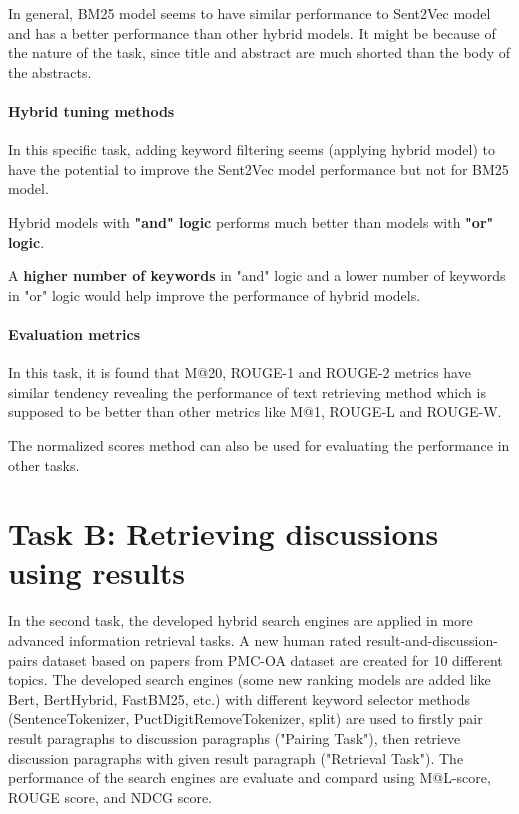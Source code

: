 \documentclass[10pt,a4paper,fleqn]{report}
\begin{document}
				In general, BM25 model seems to have similar performance to Sent2Vec model and has a better performance than other hybrid models.
				It might be because of the nature of the task, since title and abstract are much shorted than the body of the abstracts. 
				
			\paragraph{Hybrid tuning methods}
				
				In this specific task, adding keyword filtering seems (applying hybrid model) to have the potential to improve the Sent2Vec model performance but not for BM25 model.
				
				Hybrid models with \textbf{"and" logic} performs much better than models with \textbf{"or" logic}.
				
				A \textbf{higher number of keywords} in "and" logic and a lower number of keywords in "or" logic would help improve the performance of hybrid models.
			
			\paragraph{Evaluation metrics}
				
				In this task, it is found that M@20, ROUGE-1 and ROUGE-2 metrics have similar tendency revealing the performance of text retrieving method which is supposed to be better than other metrics like M@1, ROUGE-L and ROUGE-W. 
				
				The normalized scores method can also be used for evaluating the performance in other tasks.
		
	\newpage
	\section{Task B: Retrieving discussions using results}

	In the second task, the developed hybrid search engines are applied in more advanced information retrieval tasks.
	A new human rated result-and-discussion-pairs dataset based on papers from PMC-OA dataset are created for 10 different topics.
	The developed search engines (some new ranking models are added like Bert, BertHybrid, FastBM25, etc.) with different keyword selector methods (SentenceTokenizer,  PuctDigitRemoveTokenizer, split) are used to 
	firstly pair result paragraphs to discussion paragraphs ("Pairing Task"), 
	then retrieve discussion paragraphs with given result paragraph ("Retrieval Task").
	The performance of the search engines are evaluate and compard using M@L-score, ROUGE score, and NDCG score.
	
\end{document}
